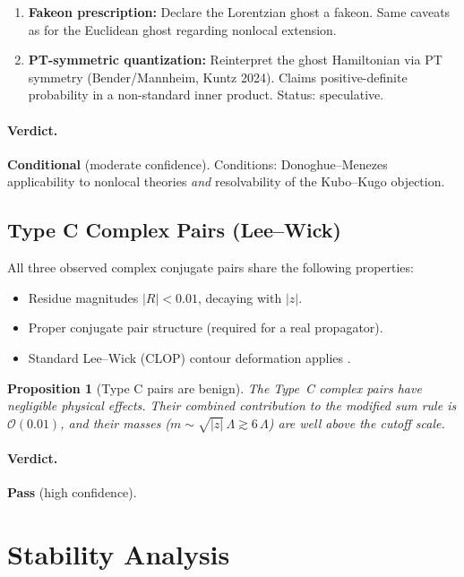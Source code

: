 \documentclass[11pt,a4paper]{article}
\newcommand{\order}{\mathcal{O}}
\newtheorem{proposition}[theorem]{Proposition}
\begin{document}
\begin{enumerate}[nosep]
  \item \textbf{Fakeon prescription:} Declare the Lorentzian ghost a
    fakeon.  Same caveats as for the Euclidean ghost regarding
    nonlocal extension.

  \item \textbf{PT-symmetric quantization:} Reinterpret the ghost
    Hamiltonian via PT symmetry (Bender/Mannheim, Kuntz 2024).
    Claims positive-definite probability in a non-standard inner
    product.  Status: speculative.
\end{enumerate}

\paragraph{Verdict.} \textbf{Conditional} (moderate confidence).
Conditions: Donoghue--Menezes applicability to nonlocal theories
\emph{and} resolvability of the Kubo--Kugo objection.

\subsection{Type C Complex Pairs (Lee--Wick)}
\label{sec:lee-wick}

All three observed complex conjugate pairs share the following
properties:
\begin{itemize}[nosep]
  \item Residue magnitudes $|R| < 0.01$, decaying with $|z|$.
  \item Proper conjugate pair structure (required for a real propagator).
  \item Standard Lee--Wick (CLOP) contour deformation applies
    \cite{CLOP2008}.
\end{itemize}

\begin{proposition}[Type C pairs are benign]
\label{prop:typeC}
The Type~C complex pairs have negligible physical effects.  Their
combined contribution to the modified sum rule is $\order(0.01)$, and
their masses ($m \sim \sqrt{|z|}\,\Lambda \gtrsim 6\,\Lambda$)
are well above the cutoff scale.
\end{proposition}

\paragraph{Verdict.} \textbf{Pass} (high confidence).


\section{Stability Analysis}
\label{sec:stability}
\end{document}
